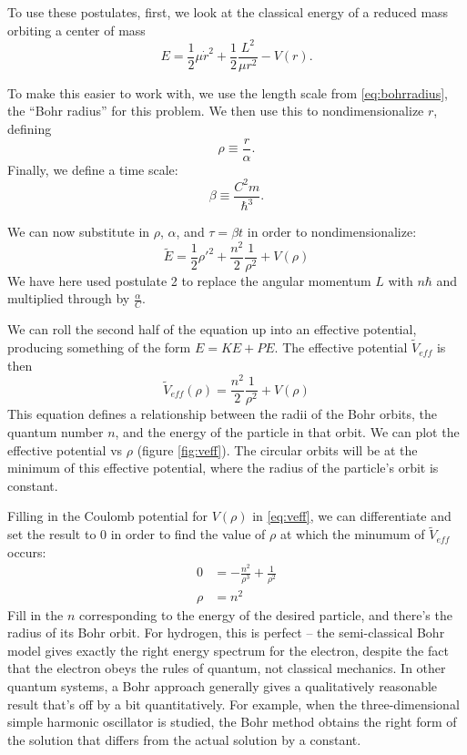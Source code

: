\documentclass[12pt,twoside]{reedthesis}
\newcommand{\eqn}[1]{\begin{equation}#1\end{equation}}
\begin{document}
To use these postulates, first, we look at the classical energy of a reduced mass orbiting a center of mass
\eqn{
E = \frac{1}{2}\mu \dot{r}^2+\frac{1}{2}\frac{L^2}{\mu r^2}-V(r)\mbox{.}
\label{eq:classical-energy}
}

To make this easier to work with, we use the length scale from \eqref{eq:bohrradius}, the ``Bohr radius'' for this problem. We then use this to nondimensionalize $r$, defining
\begin{equation}
\rho \equiv \frac{r}{\alpha}\mbox{.}
\label{eq:rho}
\end{equation}
Finally, we define a time scale:
\begin{equation}
\beta \equiv \frac{C^2m}{\hbar^3}\mbox{.}
\label{eq:beta}
\end{equation}

We can now substitute in $\rho$, $\alpha$, and $\tau = \beta t$ in order to nondimensionalize:
\begin{equation}
\tilde{E} = \frac{1}{2}\rho '^2 + \frac{n^2}{2}\frac{1}{\rho^2}+V(\rho)
\end{equation}
We have here used postulate 2 to replace the angular momentum $L$ with $n \hbar$ and multiplied through by $\frac{\alpha}{C}$. 

We can roll the second half of the equation up into an effective potential, producing something of the form $E = KE + PE$. The effective potential $\tilde{V}_{eff}$ is then
\eqn{
\tilde{V}_{eff}(\rho)=\frac{n^2}{2}\frac{1}{\rho^2}+V(\rho)
\label{eq:veff}
}
This equation defines a relationship between the radii of the Bohr orbits, the quantum number $n$, and the energy of the particle in that orbit. We can plot the effective potential vs $\rho$ (figure \ref{fig:veff}). The circular orbits will be at the minimum of this effective potential, where the radius of the particle's orbit is constant.

Filling in the Coulomb potential for $V(\rho)$ in \eqref{eq:veff}, we can differentiate and set the result to $0$ in order to find the value of $\rho$ at which the minumum of $\tilde{V}_{eff}$ occurs:
\begin{align}
0 &= -\frac{n^2}{\rho^3} + \frac{1}{\rho^2} \\
\rho & = n^2
\label{eq:rho-n}
\end{align}
Fill in the $n$ corresponding to the energy of the desired particle, and there's the radius of its Bohr orbit. For hydrogen, this is perfect -- the semi-classical Bohr model gives exactly the right energy spectrum for the electron, despite the fact that the electron obeys the rules of quantum, not classical mechanics. In other quantum systems, a Bohr approach generally gives a qualitatively reasonable result that's off by a bit quantitatively. For example, when the three-dimensional simple harmonic oscillator is studied, the Bohr method obtains the right form of the solution that differs from the actual solution by a constant.
\end{document}
